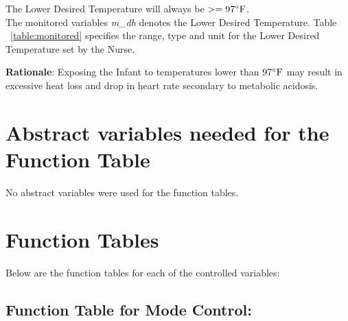 \documentclass[fontsize=12pt,paper=letter,twoside]{scrartcl}
\begin{document}
\edescription
{The Lower Desired Temperature will always be $ >= 97^{\circ}\mathrm{F}$.\\}
{The monitored variables \emph{m\_dh} denotes the Lower Desired Temperature. Table ~\ref{table:monitored} specifies the range, type and unit for the Lower Desired Temperature set by the Nurse.}
\label{E5}

\smallskip
\noindent \textbf{Rationale}: Exposing the Infant to temperatures lower than $97^{\circ}\mathrm{F}$ may result in excessive heat loss and drop in heart rate secondary to metabolic acidosis.


\newpage
\section{Abstract variables needed for the Function Table}

No abstract variables were used for the function tables.

\newpage
\section{Function Tables}

Below are the function tables for each of the controlled variables:\\

\subsection{Function Table for Mode Control: }
\end{document}
